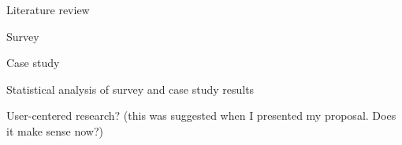 \documentclass{master_thesis}
\begin{document}

\begin{list}{-}{}
	\item Literature review
	\item Survey
	\item Case study
	\item Statistical analysis of survey and case study results
	\item User-centered research? (this was suggested when I presented my proposal. Does it make sense now?)
\end{list}

\end{document}
